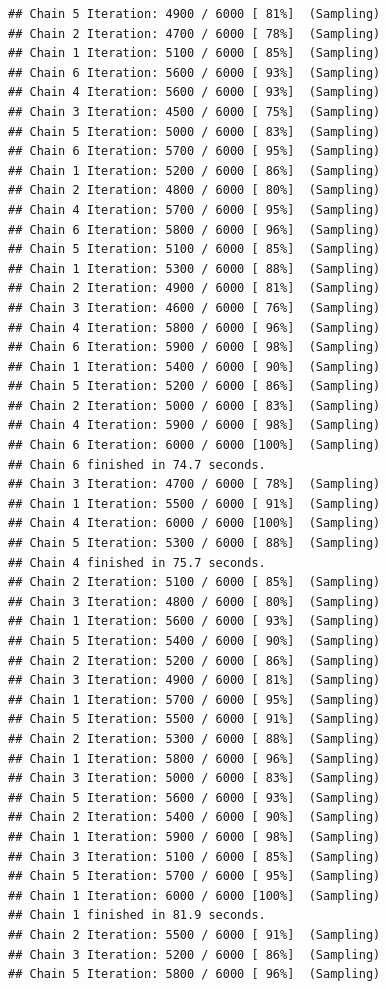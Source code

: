 \documentclass[
]{article}
\begin{document}
\begin{verbatim}
## Chain 5 Iteration: 4900 / 6000 [ 81%]  (Sampling) 
## Chain 2 Iteration: 4700 / 6000 [ 78%]  (Sampling) 
## Chain 1 Iteration: 5100 / 6000 [ 85%]  (Sampling) 
## Chain 6 Iteration: 5600 / 6000 [ 93%]  (Sampling) 
## Chain 4 Iteration: 5600 / 6000 [ 93%]  (Sampling) 
## Chain 3 Iteration: 4500 / 6000 [ 75%]  (Sampling) 
## Chain 5 Iteration: 5000 / 6000 [ 83%]  (Sampling) 
## Chain 6 Iteration: 5700 / 6000 [ 95%]  (Sampling) 
## Chain 1 Iteration: 5200 / 6000 [ 86%]  (Sampling) 
## Chain 2 Iteration: 4800 / 6000 [ 80%]  (Sampling) 
## Chain 4 Iteration: 5700 / 6000 [ 95%]  (Sampling) 
## Chain 6 Iteration: 5800 / 6000 [ 96%]  (Sampling) 
## Chain 5 Iteration: 5100 / 6000 [ 85%]  (Sampling) 
## Chain 1 Iteration: 5300 / 6000 [ 88%]  (Sampling) 
## Chain 2 Iteration: 4900 / 6000 [ 81%]  (Sampling) 
## Chain 3 Iteration: 4600 / 6000 [ 76%]  (Sampling) 
## Chain 4 Iteration: 5800 / 6000 [ 96%]  (Sampling) 
## Chain 6 Iteration: 5900 / 6000 [ 98%]  (Sampling) 
## Chain 1 Iteration: 5400 / 6000 [ 90%]  (Sampling) 
## Chain 5 Iteration: 5200 / 6000 [ 86%]  (Sampling) 
## Chain 2 Iteration: 5000 / 6000 [ 83%]  (Sampling) 
## Chain 4 Iteration: 5900 / 6000 [ 98%]  (Sampling) 
## Chain 6 Iteration: 6000 / 6000 [100%]  (Sampling) 
## Chain 6 finished in 74.7 seconds.
## Chain 3 Iteration: 4700 / 6000 [ 78%]  (Sampling) 
## Chain 1 Iteration: 5500 / 6000 [ 91%]  (Sampling) 
## Chain 4 Iteration: 6000 / 6000 [100%]  (Sampling) 
## Chain 5 Iteration: 5300 / 6000 [ 88%]  (Sampling) 
## Chain 4 finished in 75.7 seconds.
## Chain 2 Iteration: 5100 / 6000 [ 85%]  (Sampling) 
## Chain 3 Iteration: 4800 / 6000 [ 80%]  (Sampling) 
## Chain 1 Iteration: 5600 / 6000 [ 93%]  (Sampling) 
## Chain 5 Iteration: 5400 / 6000 [ 90%]  (Sampling) 
## Chain 2 Iteration: 5200 / 6000 [ 86%]  (Sampling) 
## Chain 3 Iteration: 4900 / 6000 [ 81%]  (Sampling) 
## Chain 1 Iteration: 5700 / 6000 [ 95%]  (Sampling) 
## Chain 5 Iteration: 5500 / 6000 [ 91%]  (Sampling) 
## Chain 2 Iteration: 5300 / 6000 [ 88%]  (Sampling) 
## Chain 1 Iteration: 5800 / 6000 [ 96%]  (Sampling) 
## Chain 3 Iteration: 5000 / 6000 [ 83%]  (Sampling) 
## Chain 5 Iteration: 5600 / 6000 [ 93%]  (Sampling) 
## Chain 2 Iteration: 5400 / 6000 [ 90%]  (Sampling) 
## Chain 1 Iteration: 5900 / 6000 [ 98%]  (Sampling) 
## Chain 3 Iteration: 5100 / 6000 [ 85%]  (Sampling) 
## Chain 5 Iteration: 5700 / 6000 [ 95%]  (Sampling) 
## Chain 1 Iteration: 6000 / 6000 [100%]  (Sampling) 
## Chain 1 finished in 81.9 seconds.
## Chain 2 Iteration: 5500 / 6000 [ 91%]  (Sampling) 
## Chain 3 Iteration: 5200 / 6000 [ 86%]  (Sampling) 
## Chain 5 Iteration: 5800 / 6000 [ 96%]  (Sampling) 

\end{verbatim}
\end{document}
